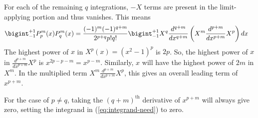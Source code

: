 \begin{enumerate}
        For each of the remaining $q$ integrations, $-X$ terms are present in the limit-applying portion and thus vanishes. This means
        \begin{align}
            \bigint_{-1}^{+1}P_p^m(x)P_q^m(x)&=\frac{(-1)^m(-1)^{q+m}}{2^{p+q}p!q!}\bigint_{-1}^{+1}X^q\frac{d^{q+m}}{dx^{q+m}}\left(X^m\frac{d^{p+m}}{dx^{p+m}}X^p\right)dx\label{eq:integrand-need}
        \end{align}
        The highest power of $x$ in $X^p(x)=\left(x^2-1\right)^p$ is $2p$. So, the highest power of $x$ in $\displaystyle\frac{d^{p+m}}{dx^{p+m}}X^p$ is $\displaystyle x^{2p-p-m}=x^{p-m}$. Similarly, $x$ will have the highest power of $2m$ in $X^m$. In the multiplied term $\displaystyle X^m\frac{d^{p+m}}{dx^{p+m}}X^p$, this gives an overall leading term of $x^{p+m}$.

        For the case of $p\ne q$, taking the $(q+m)^{\text{th}}$ derivative of $\displaystyle x^{p+m}$ will always give zero, setting the integrand in (\ref{eq:integrand-need}) to zero.


\end{enumerate}
